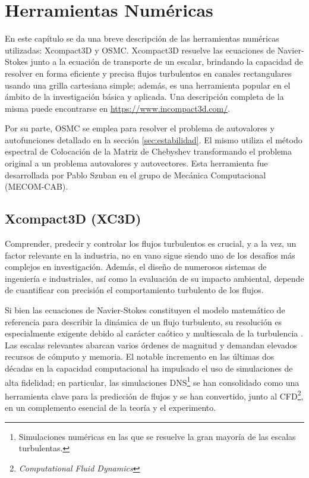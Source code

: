 \chapter{Herramientas Numéricas} \label{cap:numerico}

En este capítulo se da una breve descripción de las herramientas numéricas utilizadas: Xcompact3D y OSMC. Xcompact3D resuelve las ecuaciones de Navier-Stokes junto a la ecuación de transporte de un escalar, brindando la capacidad de resolver en forma eficiente y precisa flujos turbulentos en canales rectangulares usando una grilla cartesiana simple; además, es una herramienta popular en el ámbito de la investigación básica y aplicada. Una descripción completa de la misma puede encontrarse en \url{https://www.incompact3d.com/}.

Por su parte, OSMC se emplea para resolver el problema de autovalores y autofunciones detallado en la sección \ref{sec:estabilidad}. El mismo utiliza el método espectral de Colocación de la Matriz de Chebyshev transformando el problema original a un problema autovalores y autovectores. Esta herramienta fue desarrollada por Pablo Szuban \cite{szuban2023} en el grupo de Mecánica Computacional (MECOM-CAB). 


\section{Xcompact3D (XC3D)}

Comprender, predecir y controlar los flujos turbulentos es crucial, y a la vez, un factor relevante en la industria, no en vano sigue siendo uno de los desafíos más complejos en investigación. Además, el diseño de numerosos sistemas de ingeniería e industriales, así como la evaluación de su impacto ambiental, depende de cuantificar con precisión el comportamiento turbulento de los flujos.

Si bien las ecuaciones de Navier-Stokes constituyen el modelo matemático de referencia para describir la dinámica de un flujo turbulento, su resolución es especialmente exigente debido al carácter caótico y multiescala de la turbulencia \cite{pope2001turbulent}. Las escalas relevantes abarcan varios órdenes de magnitud y demandan elevados recursos de cómputo y memoria. El notable incremento en las últimas dos décadas en la capacidad computacional ha impulsado el uso de simulaciones de alta fidelidad; en particular, las simulaciones DNS\footnote{Simulaciones numéricas en las que se resuelve la gran mayoría de las escalas turbulentas.} se han consolidado como una herramienta clave para la predicción de flujos y se han convertido, junto al CFD\footnote{\textit{Computational Fluid Dynamics}}, en un complemento esencial de la teoría y el experimento.

